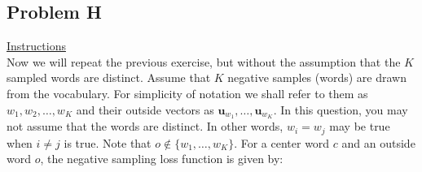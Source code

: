 \documentclass[12pt]{article}
\begin{document}
\subsection{Problem H}
\underline{Instructions}
~\\
Now we will repeat the previous exercise, but without the assumption that the $K$ sampled words are distinct.  
Assume that $K$ negative samples (words) are drawn from the vocabulary. For simplicity of notation we shall 
refer to them as $w_1, w_2, \dots, w_K$ and their outside vectors as $\bm u_{w_1}, \dots, \bm u_{w_K}$. 
In this question, you may not assume that the words are distinct. In other words, $w_i=w_j$ may be true 
when $i\neq j$ is true. Note that $o\notin\{w_1, \dots, w_K\}$. 
For a center word $c$ and an outside word $o$, the negative sampling loss function is given by:
\end{document}
